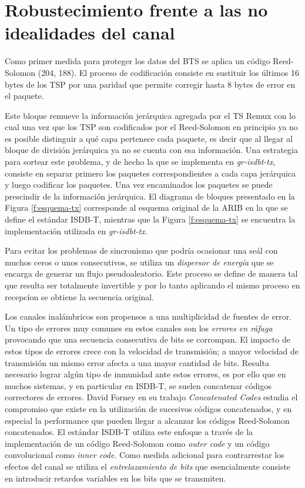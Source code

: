 \section{Robustecimiento frente a las no idealidades del canal}

Como primer medida para proteger los datos del BTS se aplica un c\'odigo Reed-Solomon (204, 188). El proceso de codificaci\'on consiste en sustituir los \'ultimos 16 bytes de los TSP por una paridad que permite corregir hasta 8 bytes de error en el paquete. 

Este bloque remueve la informaci\'on jer\'arquica agregada por el TS Remux con lo cual una vez que los TSP son codificados por el Reed-Solomon en principio ya no es posible distinguir a qu\'e capa pertenece cada paquete, es decir que al llegar al bloque de divisi\'on jer\'arquica ya no se cuenta con esa informaci\'on. Una estrategia para sortear este problema, y de hecho la que se implementa en \textit{gr-isdbt-tx}, consiste en separar primero los paquetes correspondientes a cada capa jer\'arquica y luego codificar los paquetes. Una vez encaminados los paquetes se puede prescindir de la informaci\'on jer\'arquica. El diagrama de bloques presentado en la Figura \ref{f:esquema-tx} corresponde al esquema original de la ARIB en la que se define el est\'andar ISDB-T, mientras que la Figura \ref{f:esquema-tx} se encuentra la implementaci\'on utilizada en \textit{gr-isdbt-tx}. 

Para evitar los problemas de sincronismo que podr\'ia ocasionar una se\'al con muchos ceros o unos consecutivos, se utiliza un \textit{dispersor de energ\'ia} que se encarga de generar un flujo pseudoaleatorio. Este proceso se define de manera tal que resulta ser totalmente invertible y por lo tanto aplicando el mismo proceso en recepc\'ion se obtiene la secuencia original.



Los canales inal\'ambricos son propensos a una multiplicidad de fuentes de error. Un tipo de errores muy comunes en estos canales son los \textit{errores en r\'afaga} provocando que una secuencia consecutiva de bits se corrompan. El impacto de estos tipos de errores crece con la velocidad de transmisi\'on; a mayor velocidad de transmisi\'on un mismo error afecta a una mayor cantidad de bits.
Resulta necesario lograr alg\'un tipo de inmunidad ante estos errores, es por ello que en muchos sistemas, y en particular en ISDB-T, se suelen concatenar c\'odigos correctores de errores. David Forney en su trabajo \textit{Concatenated Codes} \cite{forney1965concatenated} estudia el compromiso que existe en la utilizaci\'on de sucesivos c\'odigos concatenados, y en especial la performance que pueden llegar a alcanzar los c\'odigos Reed-Solomon concatenados.
El est\'andar ISDB-T utiliza este enfoque a trav\'es de la implementaci\'on de un c\'odigo Reed-Solomon como \textit{outer code} y un c\'odigo convolucional como \textit{inner code}.
Como medida adicional para contrarrestar los efectos del canal se utiliza el \textit{entrelazamiento de bits} que esencialmente consiste en introducir retardos variables en los bits que se transmiten.

